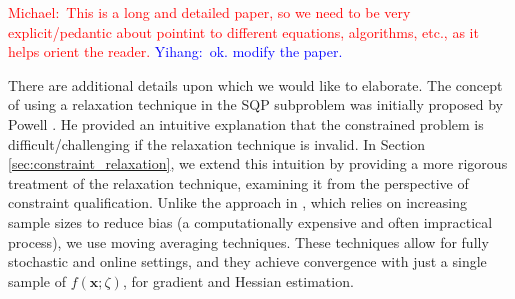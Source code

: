 \documentclass[aos]{imsart}
\numberwithin{equation}{section}
\theoremstyle{plain}
\newcommand{\michael}[1]{\textcolor{red}{Michael:\ #1}}
\newcommand{\yihang}[1]{\textcolor{blue}{Yihang:\ #1}}
\begin{document}
\michael{This is a long and detailed paper, so we need to be very explicit/pedantic about pointint to different equations, algorithms, etc., as it helps orient the reader.}
\yihang{ok. modify the paper.}

There are additional details upon which we would like to elaborate. 
The concept of using a relaxation technique in the SQP subproblem was initially proposed by Powell \cite{powell2006fast}. 
He provided an intuitive explanation that the constrained problem is difficult/challenging if the relaxation technique is invalid. 
In Section \ref{sec:constraint_relaxation}, we extend this intuition by providing a more rigorous treatment of the relaxation technique, examining it from the perspective of constraint qualification.
Unlike the approach in \cite{curtis2023sequential}, which relies on increasing sample sizes to reduce bias (a computationally expensive and often impractical process), we use moving averaging techniques. 
These techniques allow for fully stochastic and online settings, and they achieve convergence with just a single sample of $f(\bm{x};\zeta)$, for gradient and Hessian estimation. 
\end{document}
